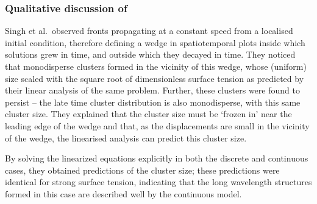 \subsubsection{Qualitative discussion of \cite{Singh2014JFM}}
Singh et al.~observed fronts propagating at a constant speed from a localised initial condition, therefore defining a wedge in spatiotemporal plots inside which solutions grew in time, and outside which they decayed in time. They noticed that monodisperse clusters formed in the vicinity of this wedge, whose (uniform) size scaled with the square root of dimensionless surface tension as predicted by their linear analysis of the same problem. Further, these clusters were found to persist -- the late time cluster distribution is also monodisperse, with this same cluster size. They explained that the cluster size must be `frozen in' near the leading edge of the wedge and that, as the displacements are small in the vicinity of the wedge, the linearised analysis can predict this cluster size.

By solving the linearized equations explicitly in both the discrete and continuous cases, they obtained predictions of the cluster size; these predictions were identical for strong surface tension, indicating that the long wavelength structures formed in this case are described well by the continuous model.

